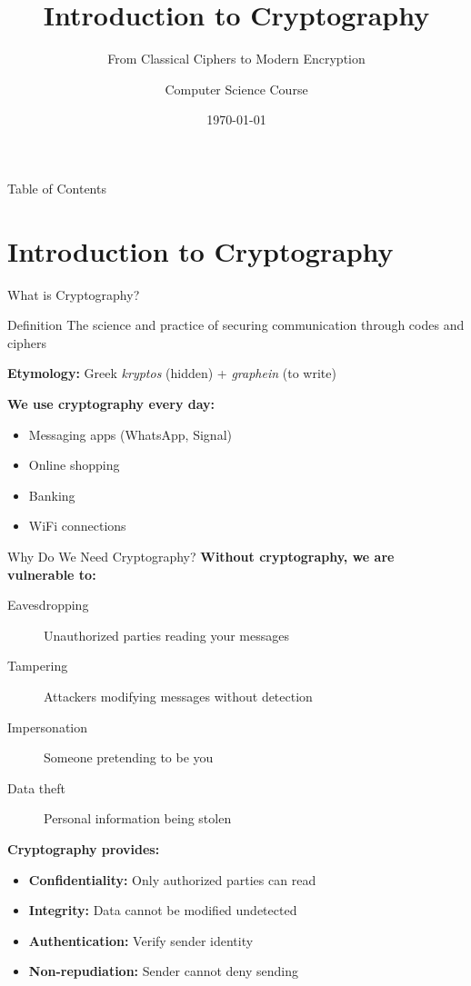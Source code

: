\documentclass{beamer}
\title{Introduction to Cryptography}
\subtitle{From Classical Ciphers to Modern Encryption}
\author{Computer Science Course}
\date{\today}
\begin{document}
\frame{\titlepage}

\begin{frame}{Table of Contents}
\tableofcontents
\end{frame}

\section{Introduction to Cryptography}

\begin{frame}{What is Cryptography?}
\begin{block}{Definition}
The science and practice of securing communication through codes and ciphers
\end{block}

\textbf{Etymology:} Greek \emph{kryptos} (hidden) + \emph{graphein} (to write) \pause

\vspace{0.5cm}
\textbf{We use cryptography every day:}
\begin{itemize}
    \item<2-> Messaging apps (WhatsApp, Signal)
    \item<3-> Online shopping
    \item<4-> Banking
    \item<5-> WiFi connections
\end{itemize}

\end{frame}

\begin{frame}{Why Do We Need Cryptography?}
\textbf{Without cryptography, we are vulnerable to:}

\begin{description}
    \item[Eavesdropping] Unauthorized parties reading your messages
    \item[Tampering] Attackers modifying messages without detection
    \item[Impersonation] Someone pretending to be you
    \item[Data theft] Personal information being stolen\pause
\end{description}


\vspace{0.5cm}
\textbf{Cryptography provides:}
\begin{itemize}
    \item \textbf{Confidentiality:} Only authorized parties can read
    \item \textbf{Integrity:} Data cannot be modified undetected
    \item \textbf{Authentication:} Verify sender identity
    \item \textbf{Non-repudiation:} Sender cannot deny sending
\end{itemize}

\end{frame}
\end{document}
